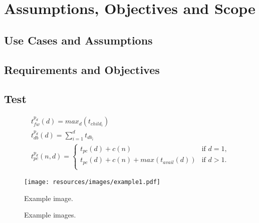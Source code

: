 
\cleardoublepage\chapter{Assumptions, Objectives and Scope}\minitoc\label{sec:assumptions}\vspace{.5cm}
\noindent\lipsum[7]

\section{Use Cases and Assumptions}
\lipsum[5]

\section{Requirements and Objectives}
\lipsum[5]

\section{Test}

\cite{Waitzman:1999}

\small
\begin{equation}
  \begin{array}{l}
    \displaystyle t^{p_d}_{fw}(d) = max_{d}(t_{child_{i}}) \\
    \displaystyle t^{p_d}_{db}(d) = \sum_{i=1}^{d} t_{db_{i}} \\
    \displaystyle t^{p_d}_{pc}(n,d) =
    	\begin{cases}
        	t_{pc}(d) + c(n) & \text{if $d = 1$,}\\
        	t_{pc}(d) + c(n) + max(t_{avail}(d)) & \text{if $d>1$.}\\
        \end{cases}
  \end{array}
  \label{eq:var_idb}
\end{equation}
\normalsize

\begin{figure}
    \centering
    \texttt{[image: resources/images/example1.pdf]}
    \caption{Example image.}
    \label{fig:example1}
\end{figure}

\begin{figure}
    \centering
    \caption{Example images.}
    \label{fig:exammple2_3}
\end{figure}


